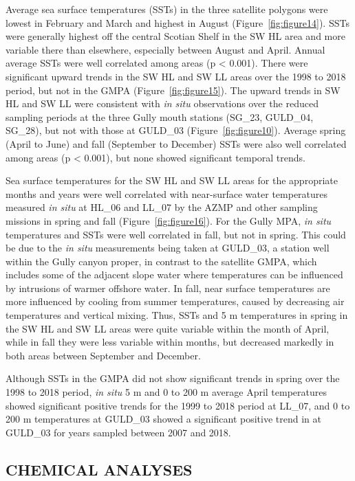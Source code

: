 \documentclass[12pt]{article}\usepackage[]{graphicx}\usepackage[]{color}
\begin{document}
Average sea surface temperatures (SSTs) in the three satellite polygons were lowest in February and March and highest in August (Figure~\ref{fig:figure14}). SSTs were generally highest off the central Scotian Shelf in the SW HL area and more variable there than elsewhere, especially between August and April. Annual average SSTs were well correlated among areas (p \textless{} 0.001). There were significant upward trends in the SW HL and SW LL areas over the 1998 to 2018 period, but not in the GMPA (Figure~\ref{fig:figure15}). The upward trends in SW HL and SW LL were consistent with \emph{in situ} observations over the reduced sampling periods at the three Gully mouth stations (SG\_23, GULD\_04, SG\_28), but not with those at GULD\_03 (Figure~\ref{fig:figure10}). Average spring (April to June) and fall (September to December) SSTs were also well correlated among areas (p \textless{} 0.001), but none showed significant temporal trends.

Sea surface temperatures for the SW HL and SW LL areas for the appropriate months and years were well correlated with near-surface water temperatures measured \emph{in situ} at HL\_06 and LL\_07 by the AZMP and other sampling missions in spring and fall (Figure~\ref{fig:figure16}). For the Gully MPA, \emph{in situ} temperatures and SSTs were well correlated in fall, but not in spring. This could be due to the \emph{in situ} measurements being taken at GULD\_03, a station well within the Gully canyon proper, in contrast to the satellite GMPA, which includes some of the adjacent slope water where temperatures can be influenced by intrusions of warmer offshore water. In fall, near surface temperatures are more influenced by cooling from summer temperatures, caused by decreasing air temperatures and vertical mixing. Thus, SSTs and 5 m temperatures in spring in the SW HL and SW LL areas were quite variable within the month of April, while in fall they were less variable within months, but decreased markedly in both areas between September and December.

Although SSTs in the GMPA did not show significant trends in spring over the 1998 to 2018 period, \emph{in situ} 5 m and 0 to 200 m average April temperatures showed significant positive trends for the 1999 to 2018 period at LL\_07, and 0 to 200 m temperatures at GULD\_03 showed a significant positive trend in at GULD\_03 for years sampled between 2007 and 2018.

\hypertarget{sec:chemical-analyses}{%
\subsection{\texorpdfstring{\textbf{CHEMICAL ANALYSES}}{CHEMICAL ANALYSES}}\label{sec:chemical-analyses}}
\end{document}
